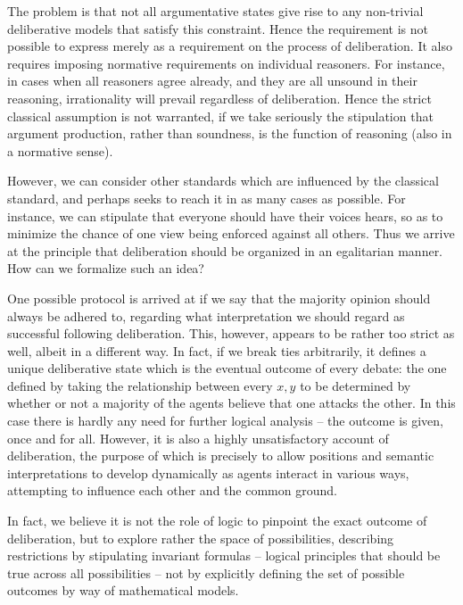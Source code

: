 \documentclass{article}
\begin{document}
The problem is that not all argumentative states give rise to any non-trivial deliberative models that satisfy this constraint. Hence the requirement is not possible to express merely as a requirement on the process of deliberation. It also requires imposing normative requirements on individual reasoners. For instance, in cases when all reasoners agree already, and they are all unsound in their reasoning, irrationality will prevail regardless of deliberation. Hence the strict classical assumption is not warranted, if we take seriously the stipulation that argument production, rather than soundness, is the function of reasoning (also in a normative sense).

However, we can consider other standards which are influenced by the classical standard, and perhaps seeks to reach it in as many cases as possible. For instance, we can stipulate that everyone should have their voices hears, so as to minimize the chance of one view being enforced against all others. Thus we arrive at the principle that deliberation should be organized in an egalitarian manner. How can we formalize such an idea?

One possible protocol is arrived at if we say that the majority opinion should always be adhered to, regarding what interpretation we should regard as successful following deliberation. This, however, appears to be rather too strict as well, albeit in a different way. In fact, if we break ties arbitrarily, it defines a unique deliberative state which is the eventual outcome of every debate: the one defined by taking the relationship between every $x,y$ to be determined by whether or not a majority of the agents believe that one attacks the other. In this case there is hardly any need for further logical analysis -- the outcome is given, once and for all. However, it is also a highly unsatisfactory account of deliberation, the purpose of which is precisely to allow positions and semantic interpretations to develop dynamically as agents interact in various ways, attempting to influence each other and the common ground. 

In fact, we believe it is not the role of logic to pinpoint the exact outcome of deliberation, but to explore rather the space of possibilities, describing restrictions by stipulating invariant formulas -- logical principles that should be true across all possibilities -- not by explicitly defining the set of possible outcomes by way of mathematical models.
\end{document}
